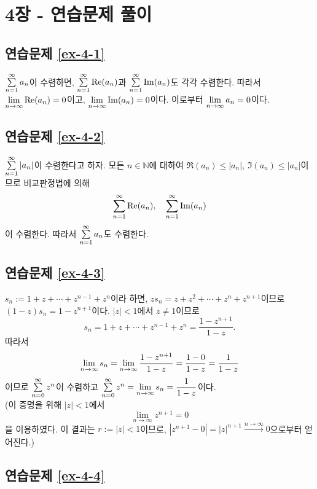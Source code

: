 
\section*{4장 - 연습문제 풀이}

\subsection*{연습문제 \ref{ex-4-1}}

$\sum\limits_{n=1}^\infty a_n$이 수렴하면,
$\sum\limits_{n=1}^\infty \Re(a_n)$과 $\sum\limits_{n=1}^\infty \Im(a_n)$도 각각 수렴한다.
따라서 $\lim\limits_{n\to\infty} \Re(a_n) = 0$이고, $\lim\limits_{n\to\infty} \Im(a_n) = 0$이다.
이로부터 $\lim\limits_{n\to\infty} a_n = 0$이다.

\subsection*{연습문제 \ref{ex-4-2}}

$\sum\limits_{n=1}^\infty |a_n|$이 수렴한다고 하자.
모든 $ n\in \mathbb N$에 대하여
$\Re(a_n) \le |a_n|$, $\Im(a_n) \le |a_n|$이므로
비교판정법에 의해
\[
\sum\limits_{n=1}^\infty \Re(a_n), \quad \sum\limits_{n=1}^\infty \Im(a_n)
\]
이 수렴한다.
따라서 $\sum\limits_{n=1}^\infty a_n$도 수렴한다.

\subsection*{연습문제 \ref{ex-4-3}}

$s_n:= 1+z+\cdots + z^{n-1}+z^n$이라 하면,
$z s_n = z + z^2 + \cdots + z^n + z^{n+1}$이므로
$(1-z)s_n = 1- z^{n+1}$이다.
$|z|<1$에서  $z\ne1$이므로
\begin{equation}\label{eq-5-21}
s_n = 1+z+\cdots + z^{n-1}+z^n = \dfrac{1-z^{n+1}}{1-z}.
\end{equation}
따라서
\[
\lim\limits_{n\to\infty} s_n = \lim_{n\to\infty}\displaystyle\frac{1-z^{n+1}}{1-z}
= \displaystyle\frac{1-0}{1-z} = \displaystyle\frac1{1-z}
\]
이므로 $\sum\limits_{n=0}^\infty z^n$이 수렴하고
$\sum\limits_{n=0}^\infty z^n = \lim\limits_{n\to\infty} s_n = \displaystyle\frac1{1-z}$이다. \\[1ex]
(이 증명을 위해 $|z|<1$에서
\[
\lim_{n\to\infty} z^{n+1} = 0
\]
을 이용하였다.  이 결과는
$r:=|z|<1$이므로, $|z^{n+1} -0| = |z|^{n+1} \stackrel{n\to\infty}{\longrightarrow }0$으로부터
얻어진다.)

\subsection*{연습문제 \ref{ex-4-4}}


